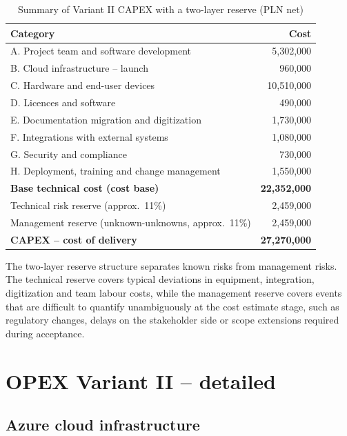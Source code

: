 \begin{table}[h]
\centering
\small
\renewcommand{\arraystretch}{1.2}
\begin{tabular}{|L{10.5cm}|r|}
\hline
{}\textbf{Category} & \textbf{Cost} \\
\hline
A. Project team and software development & 5,302,000 \\
\hline
B. Cloud infrastructure -- launch & 960,000 \\
\hline
C. Hardware and end-user devices & 10,510,000 \\
\hline
D. Licences and software & 490,000 \\
\hline
E. Documentation migration and digitization & 1,730,000 \\
\hline
F. Integrations with external systems & 1,080,000 \\
\hline
G. Security and compliance & 730,000 \\
\hline
H. Deployment, training and change management & 1,550,000 \\
\hline
{}\textbf{Base technical cost (cost base)} & \textbf{22,352,000} \\
\hline
Technical risk reserve (approx.~11\%) & 2,459,000 \\
\hline
Management reserve (unknown-unknowns, approx.~11\%) & 2,459,000 \\
\hline
{}\textbf{CAPEX -- cost of delivery} & \textbf{27,270,000} \\
\hline
\end{tabular}
\caption{Summary of Variant II CAPEX with a two-layer reserve (PLN net)}
\label{tab:capex_suma}
\end{table}

The two-layer reserve structure separates known risks from management risks. The technical reserve covers typical deviations in equipment, integration, digitization and team labour costs, while the management reserve covers events that are difficult to quantify unambiguously at the cost estimate stage, such as regulatory changes, delays on the stakeholder side or scope extensions required during acceptance.


\section{OPEX Variant II -- detailed}

\subsection{Azure cloud infrastructure}


